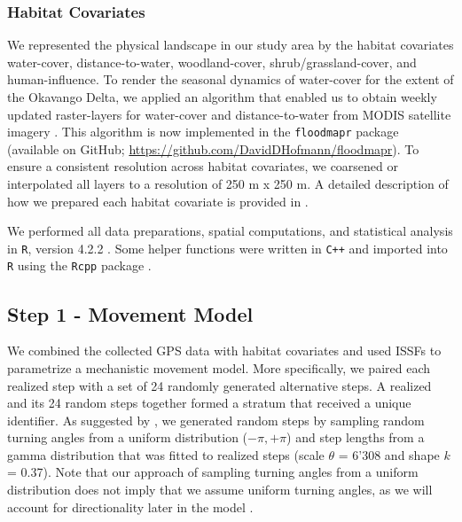 \documentclass[abstract=on,10pt,a4paper,bibliography=totocnumbered]{article}
\begin{document}
\subsubsection{Habitat Covariates}
We represented the physical landscape in our study area by the habitat
covariates \textsf{water-cover, distance-to-water, woodland-cover,
shrub/grassland-cover, and human-influence}. To render the seasonal dynamics of
water-cover for the extent of the Okavango Delta, we applied an algorithm that
enabled us to obtain weekly updated raster-layers for \textsf{water-cover} and
\textsf{distance-to-water} from MODIS satellite imagery \citep{Wolski.2017,
Hofmann.2021}. This algorithm is now implemented in the {\tt floodmapr} package
(available on GitHub; \url{https://github.com/DavidDHofmann/floodmapr}). To
ensure a consistent resolution across habitat covariates, we coarsened or
interpolated all layers to a resolution of 250 m x 250 m. A detailed description
of how we prepared each habitat covariate is provided in \cite{Hofmann.2021}.

We performed all data preparations, spatial computations, and statistical
analysis in {\tt R}, version 4.2.2 \citep{R.2022}. Some helper functions were
written in {\tt C++} and imported into {\tt R} using the {\tt Rcpp} package
\citep{Eddelbuettel.2011, Eddelbuettel.2013, Eddelbuettel.2018}.

\subsection{Step 1 - Movement Model}
We combined the collected GPS data with habitat covariates and used ISSFs
\citep{Avgar.2016} to parametrize a mechanistic movement model. More
specifically, we paired each realized step with a set of 24 randomly generated
alternative steps. A realized and its 24 random steps together formed a stratum
that received a unique identifier. As suggested by \cite{Avgar.2016}, we
generated random steps by sampling random turning angles from a uniform
distribution (\(-\pi, +\pi\)) and step lengths from a gamma distribution that
was fitted to realized steps (scale \(\theta\) = 6'308 and shape \(k\) = 0.37).
Note that our approach of sampling turning angles from a uniform distribution
does not imply that we assume uniform turning angles, as we will account for
directionality later in the model \citep{Avgar.2016, Fieberg.2021}.
\end{document}
